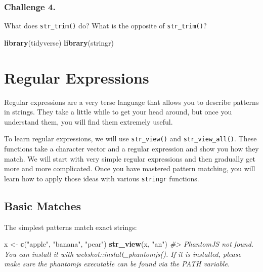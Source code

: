 \documentclass[
]{book}
\newenvironment{Shaded}{\begin{snugshade}}{\end{snugshade}}
\newcommand{\CommentTok}[1]{\textcolor[rgb]{0.56,0.35,0.01}{\textit{#1}}}
\newcommand{\KeywordTok}[1]{\textcolor[rgb]{0.13,0.29,0.53}{\textbf{#1}}}
\newcommand{\NormalTok}[1]{#1}
\newcommand{\StringTok}[1]{\textcolor[rgb]{0.31,0.60,0.02}{#1}}
\begin{document}
\hypertarget{challenge-4.-3}{%
\subsubsection*{Challenge 4.}\label{challenge-4.-3}}

What does \texttt{str\_trim()} do? What is the opposite of \texttt{str\_trim()}?

\begin{Shaded}
\begin{Highlighting}[]
\KeywordTok{library}\NormalTok{(tidyverse)}
\KeywordTok{library}\NormalTok{(stringr)}
\end{Highlighting}
\end{Shaded}

\hypertarget{regular-expressions}{%
\section{Regular Expressions}\label{regular-expressions}}

Regular expressions are a very terse language that allows you to describe patterns in strings. They take a little while to get your head around, but once you understand them, you will find them extremely useful.

To learn regular expressions, we will use \texttt{str\_view()} and \texttt{str\_view\_all()}. These functions take a character vector and a regular expression and show you how they match. We will start with very simple regular expressions and then gradually get more and more complicated. Once you have mastered pattern matching, you will learn how to apply those ideas with various \texttt{stringr} functions.

\hypertarget{basic-matches}{%
\subsection{Basic Matches}\label{basic-matches}}

The simplest patterns match exact strings:

\begin{Shaded}
\begin{Highlighting}[]
\NormalTok{x <-}\StringTok{ }\KeywordTok{c}\NormalTok{(}\StringTok{"apple"}\NormalTok{, }\StringTok{"banana"}\NormalTok{, }\StringTok{"pear"}\NormalTok{)}
\KeywordTok{str_view}\NormalTok{(x, }\StringTok{"an"}\NormalTok{)}
\CommentTok{#> PhantomJS not found. You can install it with webshot::install_phantomjs(). If it is installed, please make sure the phantomjs executable can be found via the PATH variable.}
\end{Highlighting}
\end{Shaded}
\end{document}
